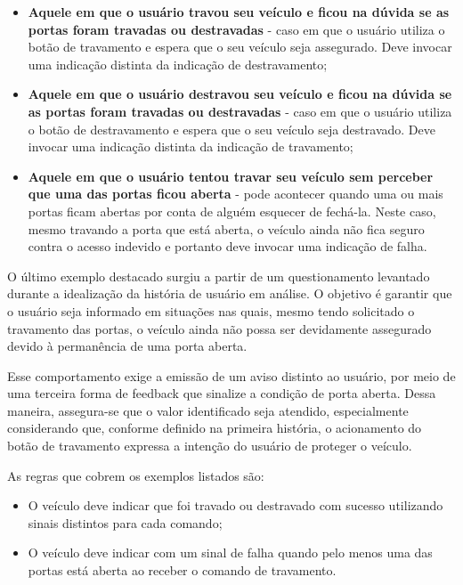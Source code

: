 \begin{itemize}
    \item \textbf{Aquele em que o usuário travou seu veículo e ficou na dúvida se as portas foram travadas ou destravadas} - caso em que o usuário utiliza o botão de travamento e espera que o seu veículo seja assegurado. Deve invocar uma indicação distinta da indicação de destravamento;
    \item \textbf{Aquele em que o usuário destravou seu veículo e ficou na dúvida se as portas foram travadas ou destravadas} - caso em que o usuário utiliza o botão de destravamento e espera que o seu veículo seja destravado. Deve invocar uma indicação distinta da indicação de travamento;
    \item \textbf{Aquele em que o usuário tentou travar seu veículo sem perceber que uma das portas ficou aberta} - pode acontecer quando uma ou mais portas ficam abertas por conta de alguém esquecer de fechá-la. Neste caso, mesmo travando a porta que está aberta, o veículo ainda não fica seguro contra o acesso indevido e portanto deve invocar uma indicação de falha.
\end{itemize} 

O último exemplo destacado surgiu a partir de um questionamento levantado durante a idealização da história de usuário em análise. O objetivo é garantir que o usuário 
seja informado em situações nas quais, mesmo tendo solicitado o travamento das portas, o veículo ainda não possa ser devidamente assegurado devido à permanência de uma 
porta aberta.

Esse comportamento exige a emissão de um aviso distinto ao usuário, por meio de uma terceira forma de feedback que sinalize a condição de porta aberta. Dessa maneira, 
assegura-se que o valor identificado seja atendido, especialmente considerando que, conforme definido na primeira história, o acionamento do botão de travamento expressa 
a intenção do usuário de proteger o veículo.

As regras que cobrem os exemplos listados são:

\begin{itemize}
    \item O veículo deve indicar que foi travado ou destravado com sucesso utilizando sinais distintos para cada comando;
    \item O veículo deve indicar com um sinal de falha quando pelo menos uma das portas está aberta ao receber o comando de travamento.
\end{itemize}

